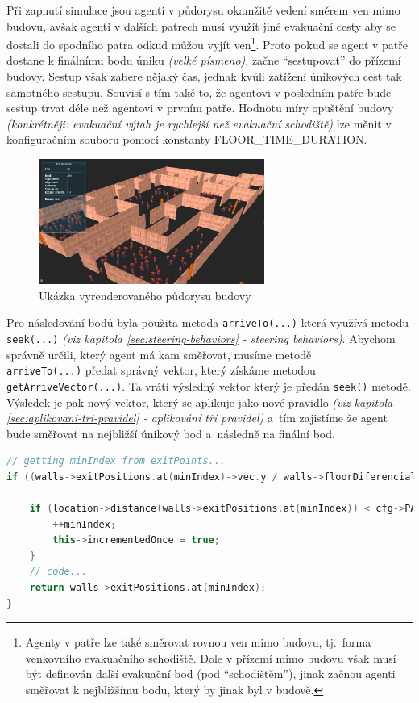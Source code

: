 \documentclass[czech,public,dept460,male,cpdeclaration]{diploma}
\begin{document}
Při zapnutí simulace jsou agenti v půdorysu okamžitě vedení směrem ven mimo budovu, avšak agenti v dalších patrech musí využít jiné evakuační cesty aby se dostali do spodního patra odkud můžou vyjít ven\footnote{Agenty v patře lze také směrovat rovnou ven mimo budovu, tj.~forma venkovního evakuačního schodiště. Dole v přízemí mimo budovu však musí být definován další evakuační bod (pod ``schodištěm''), jinak začnou agenti směřovat k nejbližšímu bodu, který by jinak byl v budově.}. Proto pokud se agent v patře dostane k finálnímu bodu úniku \textit{(velké písmeno)}, začne ``sestupovat'' do přízemí budovy. Sestup však zabere nějaký čas, jednak kvůli zatížení únikových cest tak samotného sestupu. Souvisí s tím také to, že agentovi v posledním patře bude sestup trvat déle než agentovi v prvním patře. Hodnotu míry opuštění budovy \textit{(konkrétněji: evakuační výtah je rychlejší než evakuační schodiště)} lze měnit v konfiguračním souboru pomocí konstanty FLOOR\_TIME\_DURATION.

\begin{figure}[H]\centering\includegraphics[width=0.66\textwidth]{Figures/screen5.jpg}
	\caption{Ukázka vyrenderovaného půdorysu budovy}
\end{figure}

Pro následování bodů byla použita metoda \texttt{arriveTo(...)} která využívá metodu \texttt{seek(...)} \textit{(viz kapitola \ref{sec:steering-behaviors} - steering behaviors)}. Abychom správně určili, který agent má kam směřovat, musíme metodě\\\texttt{arriveTo(...)} předat správný vektor, který získáme metodou \texttt{getArriveVector(...)}. Ta vrátí výsledný vektor který je předán \texttt{seek()} metodě. Výsledek je pak nový vektor, který se aplikuje jako nové pravidlo \textit{(viz kapitola \ref{sec:aplikovani-tri-pravidel} - aplikování tří pravidel)} a~tím zajistíme že agent bude směřovat na nejbližší únikový bod a~následně na finální bod. 

\begin{lstlisting}[language=c++,label=src:mapSave,caption=Princip metody getArriveVector(...)]
// getting minIndex from exitPoints...
if ((walls->exitPositions.at(minIndex)->vec.y / walls->floorDiferencial) == this->floor) {
	
	if (location->distance(walls->exitPositions.at(minIndex)) < cfg->PATH_TO_FIND_RADIUS && !this->incrementedOnce) {
		++minIndex;
		this->incrementedOnce = true;
	}
	// code...
	return walls->exitPositions.at(minIndex);
}
\end{lstlisting}
\end{document}
